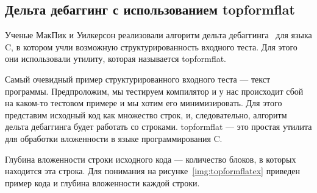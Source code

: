 \subsection{Дельта дебаггинг с использованием topformflat}
Ученые МакПик и Уилкерсон реализовали алгоритм дельта дебаггинга~\cite{delta} для языка C, в котором учли возможную структурированность входного теста. Для этого они использовали утилиту, которая называется topformflat.

Самый очевидный пример структурированного входного теста --- текст программы. Предпроложим, мы тестируем компилятор и у нас происходит сбой на каком-то тестовом примере и мы хотим его минимизировать. Для этого представим исходный код как множество строк, и, следовательно, алгоритм дельта дебаггинга будет работать со строками. topformflat --- это простая утилита для обработки вложенности в  языке программирования C. 

Глубина вложенности строки исходного кода --- количество блоков, в которых находится эта строка. Для понимания на рисунке~\ref{img:topformflatex} приведен пример кода и глубина вложенности каждой строки.

